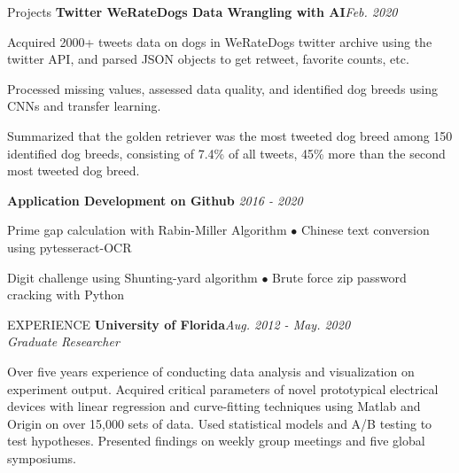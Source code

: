 \documentclass{resume} %
\begin{document}
\begin{rSection}{Projects}
\vspace{-9pt}
\textbf{Twitter WeRateDogs Data Wrangling with AI}\hfill {\em Feb. 2020}\\
\vspace{-15pt}
\begin{rSubsection}{}{}{}{}
\item Acquired 2000+ tweets data on dogs in WeRateDogs twitter archive using the twitter API, and parsed JSON objects to get retweet, favorite counts, etc.
\item Processed missing values, assessed data quality, and identified dog breeds using CNNs and transfer learning.
\item Summarized that the golden retriever was the most tweeted dog breed among 150 identified dog breeds, consisting of 7.4\% of all tweets, 45\% more than the second most tweeted dog breed.
\end{rSubsection}

\vspace{-9pt}
\textbf{Application Development on Github} \hfill {\em 2016 - 2020}\\
\vspace{-15pt}
\begin{rSubsection}{}{}{}{}
\item {Prime gap calculation with Rabin-Miller Algorithm}  \hspace{3pt} $\bullet$ {Chinese text conversion using pytesseract-OCR}
\item {Digit challenge using Shunting-yard algorithm} \hspace{29pt} $\bullet$ {Brute force zip password cracking with Python}
\end{rSubsection}

\end{rSection}


\vspace{-12pt}
\begin{rSection}{EXPERIENCE} 
\textbf{University of Florida}\hfill {\em Aug. 2012 - May. 2020}\\
\textit{Graduate Researcher}
\begin{rSubsection}{}{}{}{}
\item Over five years experience of conducting data analysis and visualization on experiment output. Acquired critical parameters of novel prototypical electrical devices with linear regression and curve-fitting techniques using Matlab and Origin on over 15,000 sets of data. Used statistical models and A/B testing to test hypotheses. Presented findings on weekly group meetings and five global symposiums.
\end{rSubsection}
\end{rSection}
\end{document}
